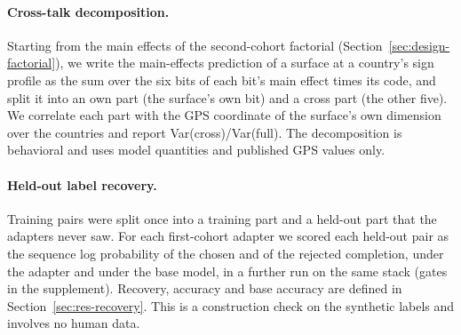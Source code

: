\paragraph{Cross-talk decomposition.} Starting from the main effects of the second-cohort factorial (Section~\ref{sec:design-factorial}), we write the main-effects prediction of a surface at a country's sign profile as the sum over the six bits of each bit's main effect times its code, and split it into an own part (the surface's own bit) and a cross part (the other five). We correlate each part with the GPS coordinate of the surface's own dimension over the countries and report Var(cross)/Var(full). The decomposition is behavioral and uses model quantities and published GPS values only.

\paragraph{Held-out label recovery.} Training pairs were split once into a training part and a held-out part that the adapters never saw. For each first-cohort adapter we scored each held-out pair as the sequence log probability of the chosen and of the rejected completion, under the adapter and under the base model, in a further run on the same stack (gates in the supplement). Recovery, accuracy and base accuracy are defined in Section~\ref{sec:res-recovery}. This is a construction check on the synthetic labels and involves no human data.